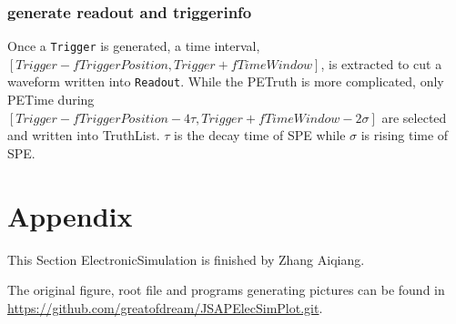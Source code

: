 \subsubsection{generate readout and triggerinfo}
Once a \texttt{Trigger} is generated, a time interval, $[Trigger-fTriggerPosition, Trigger+fTimeWindow]$, is extracted to cut a waveform written into \texttt{Readout}.
While the PETruth is more complicated, only PETime during $[Trigger-fTriggerPosition-4\tau, Trigger+fTimeWindow-2\sigma]$ are selected and written into TruthList. $\tau$
is the decay time of SPE while $\sigma$ is rising time of SPE.
\section{Appendix}

This Section ElectronicSimulation is finished by Zhang Aiqiang.

The original figure, root file and programs generating pictures can be found in \url{https://github.com/greatofdream/JSAPElecSimPlot.git}.